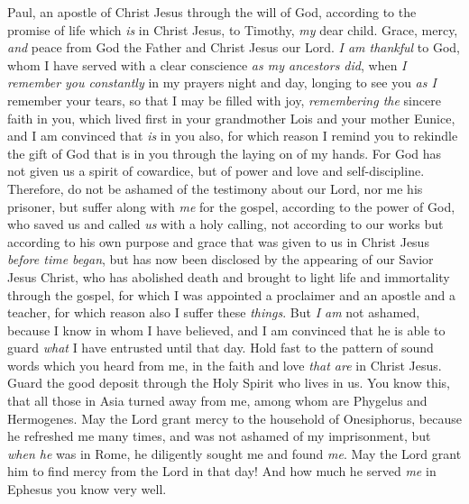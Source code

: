 
\begin{biblechapter} %
 Paul, an apostle of Christ Jesus through the will of God, according to the promise of life which \textit{is} in Christ Jesus,
\verse to Timothy, \textit{my} dear child. Grace, mercy, \textit{and} peace from God the Father and Christ Jesus our Lord.
 \textit{I am thankful} to God, whom I have served with a clear conscience \textit{as my ancestors did}, when \textit{I remember you constantly} in my prayers night and day,
\verse longing to see you \textit{as I} remember your tears, so that I may be filled with joy,
\verse \textit{remembering the} sincere faith in you, which lived first in your grandmother Lois and your mother Eunice, and I am convinced that \textit{is} in you also,
\verse for which reason I remind you to rekindle the gift of God that is in you through the laying on of my hands.
\verse For God has not given us a spirit of cowardice, but of power and love and self-discipline.
 Therefore, do not be ashamed of the testimony about our Lord, nor me his prisoner, but suffer along with \textit{me} for the gospel, according to the power of God,
\verse who saved us and called \textit{us} with a holy calling, not according to our works but according to his own purpose and grace that was given to us in Christ Jesus \textit{before time began},
\verse but has now been disclosed by the appearing of our Savior Jesus Christ, who has abolished death and brought to light life and immortality through the gospel,
\verse for which I was appointed a proclaimer and an apostle and a teacher,
\verse for which reason also I suffer these \textit{things}. But \textit{I am} not ashamed, because I know in whom I have believed, and I am convinced that he is able to guard \textit{what} I have entrusted until that day.
\verse Hold fast to the pattern of sound words which you heard from me, in the faith and love \textit{that are} in Christ Jesus.
\verse Guard the good deposit through the Holy Spirit who lives in us.
\verse You know this, that all those in Asia turned away from me, among whom are Phygelus and Hermogenes.
\verse May the Lord grant mercy to the household of Onesiphorus, because he refreshed me many times, and was not ashamed of my imprisonment,
\verse but \textit{when he} was in Rome, he diligently sought me and found \textit{me}.
\verse May the Lord grant him to find mercy from the Lord in that day! And how much he served \textit{me} in Ephesus you know very well.
\end{biblechapter}

